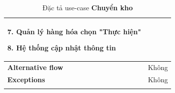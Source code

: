 {\begin{longtable}{| p{} | p{} |}
                    7. Quản lý hàng hóa chọn "Thực hiện"
                    
                    8. Hệ thống cập nhật thông tin
                \\
                \hline
                    \textbf{Alternative flow}
                &
                    Không
                \\
                \hline
                    \textbf{Exceptions} 
                &
                    Không
                \\
                \hline
                \caption{Đặc tả use-case \textbf{Chuyển kho}}
            \end{longtable}
        }

